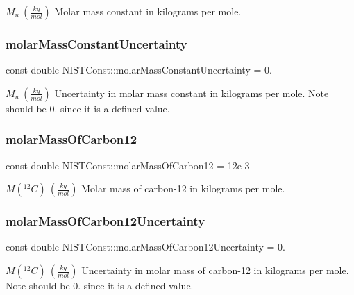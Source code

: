 $M_u \ (\frac{kg}{mol})$ Molar mass constant in kilograms per mole. \mbox{\label{group___molar_mass_constant_ga7aea373fd7ef8740aa22140aab339ce8}} 
\subsubsection{\texorpdfstring{molar\+Mass\+Constant\+Uncertainty}{molarMassConstantUncertainty}}
{\footnotesize\ttfamily const double N\+I\+S\+T\+Const\+::molar\+Mass\+Constant\+Uncertainty = 0.}

$M_u \ (\frac{kg}{mol})$ Uncertainty in molar mass constant in kilograms per mole. Note should be 0. since it is a defined value. \mbox{\label{group___molar_mass_constant_gab1aae3b38f21cb9a15fdc8209d3cf1f0}} 
\subsubsection{\texorpdfstring{molar\+Mass\+Of\+Carbon12}{molarMassOfCarbon12}}
{\footnotesize\ttfamily const double N\+I\+S\+T\+Const\+::molar\+Mass\+Of\+Carbon12 = 12e-\/3}

$M({^{12}C}) \ (\frac{kg}{mol})$ Molar mass of carbon-\/12 in kilograms per mole. \mbox{\label{group___molar_mass_constant_gae2fea17985c3e8877e1baab9f9382676}} 
\subsubsection{\texorpdfstring{molar\+Mass\+Of\+Carbon12\+Uncertainty}{molarMassOfCarbon12Uncertainty}}
{\footnotesize\ttfamily const double N\+I\+S\+T\+Const\+::molar\+Mass\+Of\+Carbon12\+Uncertainty = 0.}

$M({^{12}C}) \ (\frac{kg}{mol})$ Uncertainty in molar mass of carbon-\/12 in kilograms per mole. Note should be 0. since it is a defined value. 